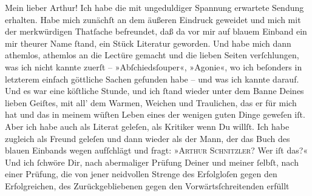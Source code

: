 \pstart\center{}Mein lieber Arthur!\pend\vspace{0.5em}
\pstart
           Ich habe die mit ungeduldiger Spannung erwartete Sendung erhalten. Habe mich zunächſt an dem äußeren Eindruck
               geweidet und mich mit der merkwürdigen Thatſache befreundet, daß da vor mir auf
               blauem Einband \strikeout{\textcolor{gray}{×}} ein mir theurer Name{ }ſtand, ein Stück Literatur geworden. Und habe mich dann
               athemlos, athemlos an die Lectüre gemacht und die lieben Seiten verſchlungen, was ich nicht kannte
               zuerſt – »Abſchiedsſouper«, »Agonie«, wo ich beſonders in letzterem {\pb}einfach göttliche Sachen gefunden habe – und was ich
               kannte darauf. Und es war eine köſtliche Stunde, und ich{ }ſtand wieder unter dem Banne
               Deines lieben Geiſtes, mit all’ dem Warmen, Weichen und Traulichen, das er für mich
               hat und das in meinem wüſten Leben eines der wenigen guten Dinge geweſen iſt. Aber
               ich habe auch als Literat geleſen, als Kritiker wenn Du willſt. Ich habe zugleich als
               Freund geleſen und dann wieder als der Mann, der das Buch des blauen Einbands wegen aufſchlägt
               und fragt: »\textsc{Arthur Schnitzler}? Wer iſt das?« Und ich{ }ſchwöre Dir, nach abermaliger Prüfung Deiner und meiner{ }ſelbſt, nach einer Prüfung,
                  {\pb}die von jener neidvollen Strenge des Erfolgloſen
               gegen den Erfolgreichen, des Zurückgebliebenen gegen den Vorwärtsſchreitenden erfüllt

